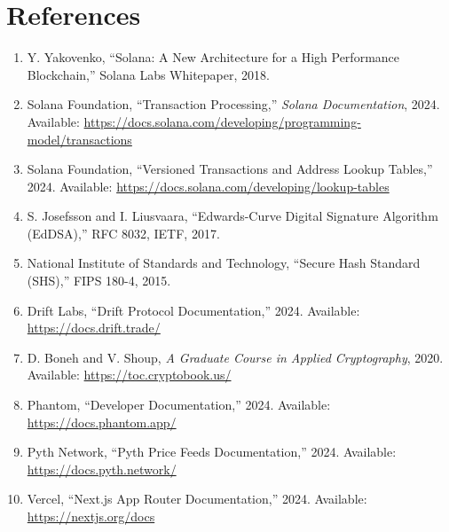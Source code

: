 \documentclass[11pt,a4paper]{article}
\begin{document}
\section{References}

\begin{enumerate}
    \item Y. Yakovenko, ``Solana: A New Architecture for a High Performance Blockchain,'' Solana Labs Whitepaper, 2018.
    \item Solana Foundation, ``Transaction Processing,'' \textit{Solana Documentation}, 2024. Available: \url{https://docs.solana.com/developing/programming-model/transactions}
    \item Solana Foundation, ``Versioned Transactions and Address Lookup Tables,'' 2024. Available: \url{https://docs.solana.com/developing/lookup-tables}
    \item S. Josefsson and I. Liusvaara, ``Edwards-Curve Digital Signature Algorithm (EdDSA),'' RFC 8032, IETF, 2017.
    \item National Institute of Standards and Technology, ``Secure Hash Standard (SHS),'' FIPS 180-4, 2015.
    \item Drift Labs, ``Drift Protocol Documentation,'' 2024. Available: \url{https://docs.drift.trade/}
    \item D. Boneh and V. Shoup, \textit{A Graduate Course in Applied Cryptography}, 2020. Available: \url{https://toc.cryptobook.us/}
    \item Phantom, ``Developer Documentation,'' 2024. Available: \url{https://docs.phantom.app/}
    \item Pyth Network, ``Pyth Price Feeds Documentation,'' 2024. Available: \url{https://docs.pyth.network/}
    \item Vercel, ``Next.js App Router Documentation,'' 2024. Available: \url{https://nextjs.org/docs}
\end{enumerate}
\end{document}
